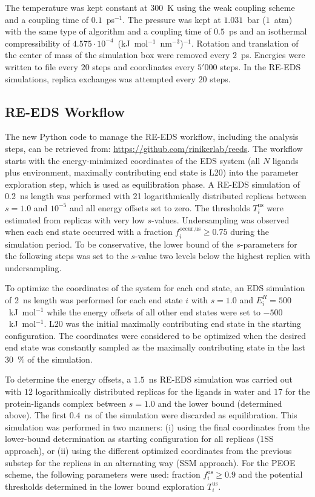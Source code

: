 The temperature was kept constant at $300$~K using the weak coupling scheme \cite{Berendsen1984} and a coupling time of $0.1$~ps$^{-1}$. The pressure was kept at $1.031$~bar ($1$~atm) with the same type of algorithm and a coupling time of $0.5$~ps and an isothermal compressibility of $4.575 \cdot 10^{-4}$~(kJ~mol$^{-1}$~nm$^{-3}$)$^{-1}$.
Rotation and translation of the center of mass of the simulation box were removed every $2$~ps. 
Energies were written to file every $20$ steps and coordinates every $5'000$ steps.
In the RE-EDS simulations, replica exchanges was attempted every $20$ steps.

\subsection{RE-EDS Workflow}
The new Python code to manage the RE-EDS workflow, including the analysis steps, can be retrieved from: \url{https://github.com/rinikerlab/reeds}.
The workflow starts with the energy-minimized coordinates of the EDS system (all $N$ ligands plus environment, maximally contributing end state is L20) into the parameter exploration step, which is used as equilibration phase.
A RE-EDS simulation of 0.2~ns length was performed with 21 logarithmically distributed replicas between $s=1.0$ and $10^{-5}$ and all energy offsets set to zero.  
The thresholds $T_{i}^{\text{us}}$ were estimated from replicas with very low $s$-values.
Undersampling was observed when each end state occurred with a fraction $f_{i}^{\text{occur,us}} \ge 0.75$ during the simulation period.
To be conservative, the lower bound of the $s$-parameters for the following steps was set to the $s$-value two levels below the highest replica with undersampling.

To optimize the coordinates of the system for each end state, an EDS simulation of 2~ns length was performed for each end state $i$ with $s=1.0$ and $E^R_i=500$~kJ~mol$^{-1}$ while the energy offsets of all other end states were set to $-500$~kJ~mol$^{-1}$. L20 was the initial maximally contributing end state in the starting configuration. 
The coordinates were considered to be optimized when the desired end state was constantly sampled as the maximally contributing state in the last 30~\% of the simulation. 

To determine the energy offsets, a $1.5$~ns RE-EDS simulation was carried out with $12$ logarithmically distributed replicas for the ligands in water and $17$ for the protein-ligands complex between $s=1.0$ and the lower bound (determined above). The first $0.4$~ns of the simulation were discarded as equilibration. This simulation was performed in two manners: (i) using the final coordinates from the lower-bound determination as starting configuration for all replicas (1SS approach), or (ii) using the different optimized coordinates from the previous substep for the replicas in an alternating way (SSM approach). 
For the PEOE \cite{Sidler2016} scheme, the following parameters were used: fraction $f_{i}^{\text{us}} \ge 0.9$ and the potential thresholds determined in the lower bound exploration $T_{i}^{\text{us}}$.

